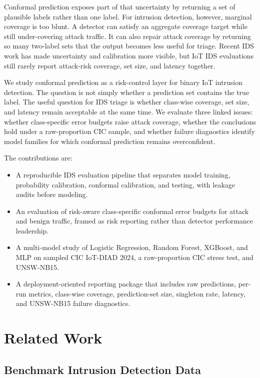 \documentclass[11pt]{article}
\begin{document}
Conformal prediction exposes part of that uncertainty by returning a set of plausible labels rather than one label. For intrusion detection, however, marginal coverage is too blunt. A detector can satisfy an aggregate coverage target while still under-covering attack traffic. It can also repair attack coverage by returning so many two-label sets that the output becomes less useful for triage. Recent IDS work has made uncertainty and calibration more visible, but IoT IDS evaluations still rarely report attack-risk coverage, set size, and latency together.

We study conformal prediction as a risk-control layer for binary IoT intrusion detection. The question is not simply whether a prediction set contains the true label. The useful question for IDS triage is whether class-wise coverage, set size, and latency remain acceptable at the same time. We evaluate three linked issues: whether class-specific error budgets raise attack coverage, whether the conclusions hold under a raw-proportion CIC sample, and whether failure diagnostics identify model families for which conformal prediction remains overconfident.

The contributions are:

\begin{itemize}
  \item A reproducible IDS evaluation pipeline that separates model training, probability calibration, conformal calibration, and testing, with leakage audits before modeling.
  \item An evaluation of risk-aware class-specific conformal error budgets for attack and benign traffic, framed as risk reporting rather than detector performance leadership.
  \item A multi-model study of Logistic Regression, Random Forest, XGBoost, and MLP on sampled CIC IoT-DIAD 2024, a raw-proportion CIC stress test, and UNSW-NB15.
  \item A deployment-oriented reporting package that includes raw predictions, per-run metrics, class-wise coverage, prediction-set size, singleton rate, latency, and UNSW-NB15 failure diagnostics.
\end{itemize}

\section{Related Work}

\subsection{Benchmark Intrusion Detection Data}
\end{document}
